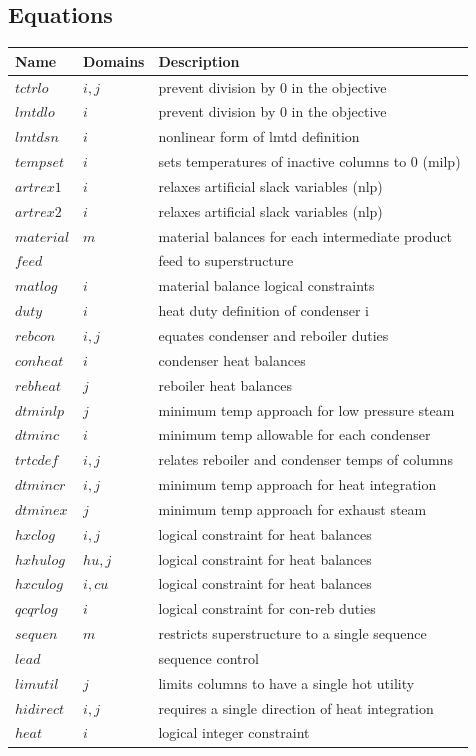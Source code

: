 \documentclass[11pt]{article}
\begin{document}
\subsection*{Equations}
\begin{tabularx}{\textwidth}{| l | l | X |}
\hline
\textbf{Name} & \textbf{Domains} & \textbf{Description}\\
\hline
\endhead

$tctrlo$ & $i,j$ & prevent division by 0 in the objective\\
$lmtdlo$ & $i$ & prevent division by 0 in the objective\\
$lmtdsn$ & $i$ & nonlinear form of lmtd definition\\
$tempset$ & $i$ & sets temperatures of inactive columns to 0 (milp)\\
$artrex1$ & $i$ & relaxes artificial slack variables (nlp)\\
$artrex2$ & $i$ & relaxes artificial slack variables (nlp)\\
$material$ & $m$ & material balances for each intermediate product\\
$feed$ &  & feed to superstructure\\
$matlog$ & $i$ & material balance logical constraints\\
$duty$ & $i$ & heat duty definition of condenser i\\
$rebcon$ & $i,j$ & equates condenser and reboiler duties\\
$conheat$ & $i$ & condenser heat balances\\
$rebheat$ & $j$ & reboiler heat balances\\
$dtminlp$ & $j$ & minimum temp approach for low pressure steam\\
$dtminc$ & $i$ & minimum temp allowable for each condenser\\
$trtcdef$ & $i,j$ & relates reboiler and condenser temps of columns\\
$dtmincr$ & $i,j$ & minimum temp approach for heat integration\\
$dtminex$ & $j$ & minimum temp approach for exhaust steam\\
$hxclog$ & $i,j$ & logical constraint for heat balances\\
$hxhulog$ & $hu,j$ & logical constraint for heat balances\\
$hxculog$ & $i,cu$ & logical constraint for heat balances\\
$qcqrlog$ & $i$ & logical constraint for con-reb duties\\
$sequen$ & $m$ & restricts superstructure to a single sequence\\
$lead$ &  & sequence control\\
$limutil$ & $j$ & limits columns to have a single hot utility\\
$hidirect$ & $i,j$ & requires a single direction of heat integration\\
$heat$ & $i$ & logical integer constraint\\
\hline
\end{tabularx}
\end{document}
